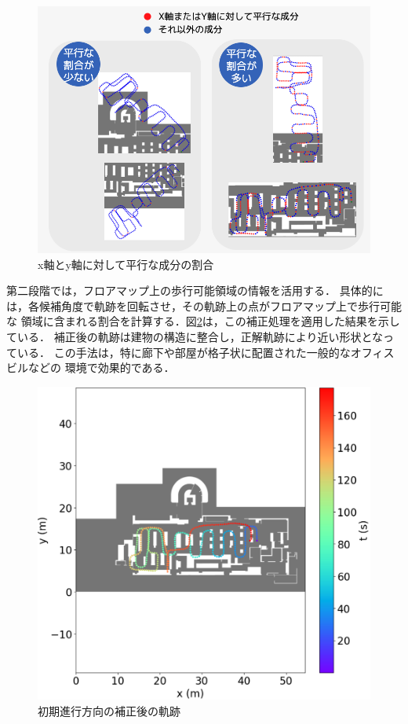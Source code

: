 \begin{figure}[H]
	\centering
	\includegraphics[width=\linewidth]{../image/parallel.jpg}
	\caption{x軸とy軸に対して平行な成分の割合}    \label{fig:parallel}
\end{figure}

第二段階では，フロアマップ上の歩行可能領域の情報を活用する．
具体的には，各候補角度で軌跡を回転させ，その軌跡上の点がフロアマップ上で歩行可能な
領域に含まれる割合を計算する．図\ref{fig:pdr-rotate}は，この補正処理を適用した結果を示している．
補正後の軌跡は建物の構造に整合し，正解軌跡により近い形状となっている．
この手法は，特に廊下や部屋が格子状に配置された一般的なオフィスビルなどの
環境で効果的である．

\begin{figure}[H]
	\centering
	\includegraphics[width=\linewidth]{../image/pdr-rotate.jpg}
	\caption{初期進行方向の補正後の軌跡}    \label{fig:pdr-rotate}
\end{figure}



